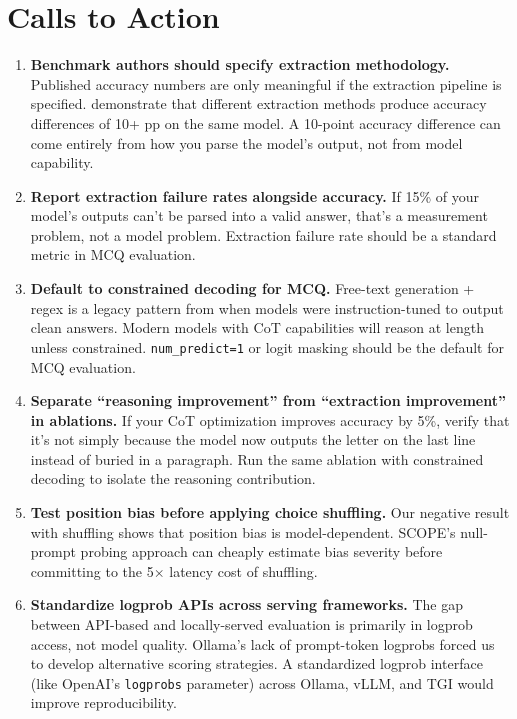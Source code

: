 \documentclass[11pt]{article}
\begin{document}
\section{Calls to Action}

\begin{enumerate}
    \item \textbf{Benchmark authors should specify extraction methodology.} Published accuracy numbers are only meaningful if the extraction pipeline is specified. \citet{molfese2025} demonstrate that different extraction methods produce accuracy differences of 10+ pp on the same model. A 10-point accuracy difference can come entirely from how you parse the model's output, not from model capability.

    \item \textbf{Report extraction failure rates alongside accuracy.} If 15\% of your model's outputs can't be parsed into a valid answer, that's a measurement problem, not a model problem. Extraction failure rate should be a standard metric in MCQ evaluation.

    \item \textbf{Default to constrained decoding for MCQ.} Free-text generation + regex is a legacy pattern from when models were instruction-tuned to output clean answers. Modern models with CoT capabilities will reason at length unless constrained. \texttt{num\_predict=1} or logit masking should be the default for MCQ evaluation.

    \item \textbf{Separate ``reasoning improvement'' from ``extraction improvement'' in ablations.} If your CoT optimization improves accuracy by 5\%, verify that it's not simply because the model now outputs the letter on the last line instead of buried in a paragraph. Run the same ablation with constrained decoding to isolate the reasoning contribution.

    \item \textbf{Test position bias before applying choice shuffling.} Our negative result with shuffling shows that position bias is model-dependent. SCOPE's null-prompt probing approach can cheaply estimate bias severity before committing to the 5$\times$ latency cost of shuffling.

    \item \textbf{Standardize logprob APIs across serving frameworks.} The gap between API-based and locally-served evaluation is primarily in logprob access, not model quality. Ollama's lack of prompt-token logprobs forced us to develop alternative scoring strategies. A standardized logprob interface (like OpenAI's \texttt{logprobs} parameter) across Ollama, vLLM, and TGI would improve reproducibility.
\end{enumerate}
\end{document}
